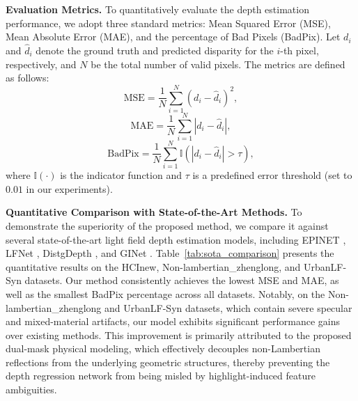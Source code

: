 \documentclass[lettersize,journal]{IEEEtran}
\begin{document}
\textbf{Evaluation Metrics.} 
To quantitatively evaluate the depth estimation performance, we adopt three standard metrics: Mean Squared Error (MSE), Mean Absolute Error (MAE), and the percentage of Bad Pixels (BadPix). Let $d_i$ and $\hat{d}_i$ denote the ground truth and predicted disparity for the $i$-th pixel, respectively, and $N$ be the total number of valid pixels. The metrics are defined as follows:
\begin{equation}
\text{MSE} = \frac{1}{N} \sum_{i=1}^{N} (d_i - \hat{d}_i)^2,
\end{equation}
\begin{equation}
\text{MAE} = \frac{1}{N} \sum_{i=1}^{N} |d_i - \hat{d}_i|,
\end{equation}
\begin{equation}
\text{BadPix} = \frac{1}{N} \sum_{i=1}^{N} \mathbb{I}(|d_i - \hat{d}_i| > \tau),
\end{equation}
where $\mathbb{I}(\cdot)$ is the indicator function and $\tau$ is a predefined error threshold (set to $0.01$ in our experiments).

\textbf{Quantitative Comparison with State-of-the-Art Methods.}
To demonstrate the superiority of the proposed method, we compare it against several state-of-the-art light field depth estimation models, including EPINET \cite{shin2018epinet}, LFNet \cite{wang2018lfnet}, DistgDepth \cite{wang2020distgdepth}, and GINet \cite{jin2021ginet}. Table~\ref{tab:sota_comparison} presents the quantitative results on the HCInew, Non-lambertian\_zhenglong, and UrbanLF-Syn datasets. Our method consistently achieves the lowest MSE and MAE, as well as the smallest BadPix percentage across all datasets. Notably, on the Non-lambertian\_zhenglong and UrbanLF-Syn datasets, which contain severe specular and mixed-material artifacts, our model exhibits significant performance gains over existing methods. This improvement is primarily attributed to the proposed dual-mask physical modeling, which effectively decouples non-Lambertian reflections from the underlying geometric structures, thereby preventing the depth regression network from being misled by highlight-induced feature ambiguities.
\end{document}
